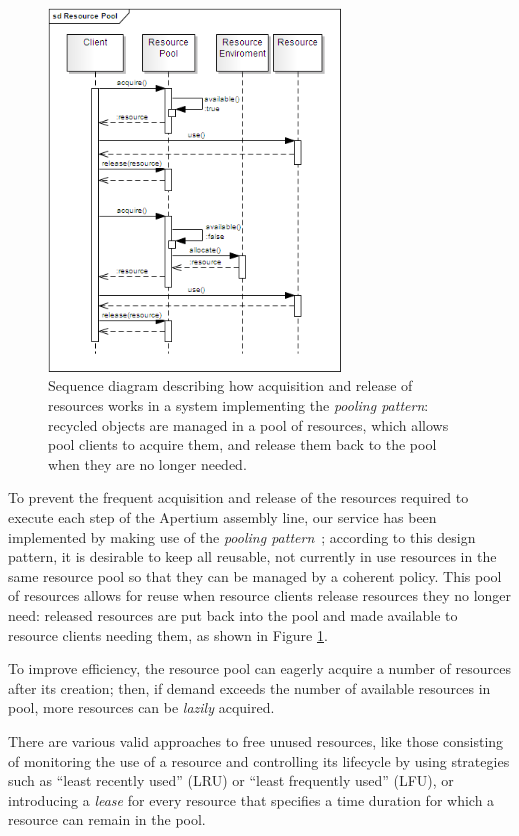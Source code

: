 \documentclass[11pt]{article}
\begin{document}
\begin{figure}[!ht]
\begin{center}
\includegraphics[width=7.75cm]{resource_pool}
\end{center}
\caption{Sequence diagram describing how acquisition and release of resources works in a system implementing the \emph{pooling pattern}: recycled objects are managed in a pool of resources, which allows pool clients to acquire them, and release them back to the pool when they are no longer needed.}
\label{fig:rp}
\end{figure}

To prevent the frequent acquisition and release of the resources required to execute each step of the Apertium assembly line, our service has been implemented by making use of the \emph{pooling pattern}~\citep{kircher2001}; according to this design pattern, it is desirable to keep all reusable, not currently in use resources in the same resource pool so that they can be managed by a coherent policy.
This pool of resources allows for reuse when resource clients release resources they no longer need: released resources are put back into the pool and made available to resource clients needing them, as shown in Figure \ref{fig:rp}.

To improve efficiency, the resource pool can eagerly acquire a number of resources after its creation; then, if demand exceeds the number of available resources in pool, more resources can be \emph{lazily} acquired.

There are various valid approaches to free unused resources, like those consisting of monitoring the use of a resource and controlling its lifecycle by using  strategies such as ``least recently used'' (LRU) or ``least frequently used'' (LFU), or introducing a \emph{lease} for every resource that specifies a time duration for which a resource can remain in the pool.
\end{document}
